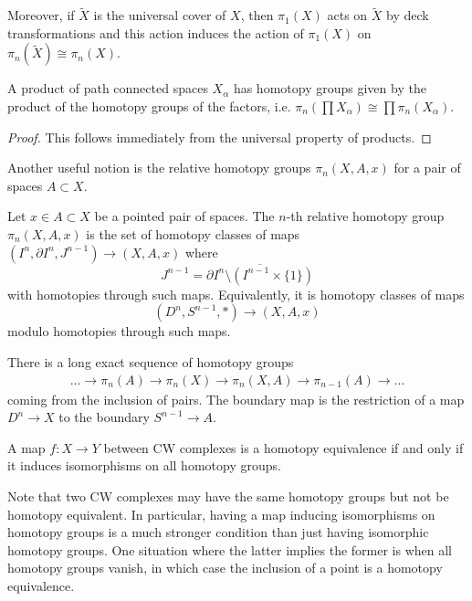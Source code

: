 \documentclass[12pt]{article}
\begin{document}
Moreover, if $\tilde X$ is the universal cover of $X$, then $\pi_1(X)$ acts on $\tilde X$ by deck transformations and this action induces the action of $\pi_1(X)$ on $\pi_n(\tilde X) \cong \pi_n(X)$. 

\begin{proposition}
    A product of path connected spaces $X_\alpha$ has homotopy groups given by the product of the homotopy groups of the factors, i.e. $\pi_n(\prod X_\alpha) \cong \prod \pi_n(X_\alpha)$.
\end{proposition}

\begin{proof}
This follows immediately from the universal property of products. 
\end{proof}

Another useful notion is the relative homotopy groups $\pi_n(X,A,x)$ for a pair of spaces $A \subset X$. \begin{definition}
Let $x\in A \subset X$ be a pointed pair of spaces. The $n$-th relative homotopy group $\pi_n(X,A,x)$ is the set
    of homotopy classes of maps $(I^n, \partial I^n,J^{n-1}) \to (X,A,x)$ where \[J^{n-1}=\overline{\partial I^n\setminus (I^{n-1}\times\{1\})}\] with homotopies through such maps. Equivalently, it is homotopy classes of maps \[(D^n, S^{n-1}, *) \to (X,A,x)\] modulo homotopies through such maps. 
\end{definition}

\begin{theorem}
    There is a long exact sequence of homotopy groups \begin{align*}
    \dots \to \pi_n(A) \to \pi_n(X) \to \pi_n(X,A) \to \pi_{n-1}(A) \to \dots
    \end{align*} coming from the inclusion of pairs. The boundary map is the restriction of a map $D^n \to X$ to the boundary $S^{n-1} \to A$.
\end{theorem}

\begin{theorem}
    A map $f: X \to Y$ between CW complexes is a homotopy equivalence if and only if it induces isomorphisms on all homotopy groups.
\end{theorem}

Note that two CW complexes may have the same homotopy groups but not be homotopy equivalent. In particular, having a map inducing isomorphisms on homotopy groups is a much stronger condition than just having isomorphic homotopy groups. One situation where the latter implies the former is when all homotopy groups vanish, in which case the inclusion of a point is a homotopy equivalence.
\end{document}
